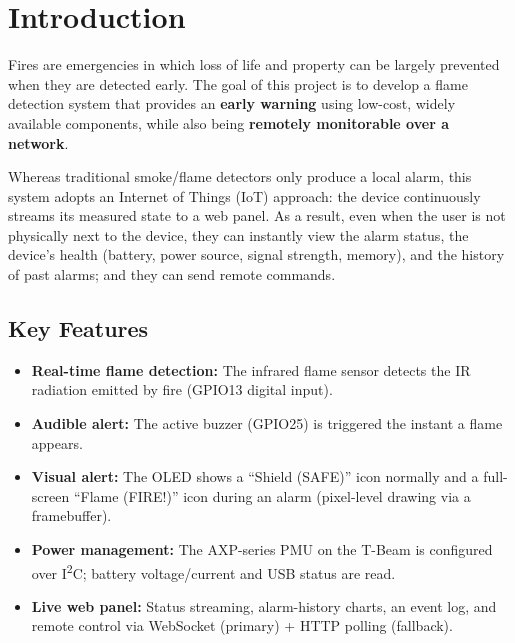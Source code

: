 \documentclass[11pt,a4paper]{article}
\begin{document}
\vspace{0.5cm}
\tableofcontents
\newpage

\section{Introduction}

Fires are emergencies in which loss of life and property can be largely prevented when
they are detected early. The goal of this project is to develop a flame detection system
that provides an \textbf{early warning} using low-cost, widely available components, while
also being \textbf{remotely monitorable over a network}.

Whereas traditional smoke/flame detectors only produce a local alarm, this system adopts
an Internet of Things (IoT) approach: the device continuously streams its measured state
to a web panel. As a result, even when the user is not physically next to the device, they
can instantly view the alarm status, the device's health (battery, power source, signal
strength, memory), and the history of past alarms; and they can send remote commands.

\subsection{Key Features}
\begin{itemize}[leftmargin=1.4em]
  \item \textbf{Real-time flame detection:} The infrared flame sensor detects the IR
        radiation emitted by fire (GPIO13 digital input).
  \item \textbf{Audible alert:} The active buzzer (GPIO25) is triggered the instant a
        flame appears.
  \item \textbf{Visual alert:} The OLED shows a ``Shield (SAFE)'' icon normally and a
        full-screen ``Flame (FIRE!)'' icon during an alarm (pixel-level drawing via a
        framebuffer).
  \item \textbf{Power management:} The AXP-series PMU on the T-Beam is configured over
        I\textsuperscript{2}C; battery voltage/current and USB status are read.
  \item \textbf{Live web panel:} Status streaming, alarm-history charts, an event log, and
        remote control via WebSocket (primary) + HTTP polling (fallback).
\end{itemize}
\end{document}
